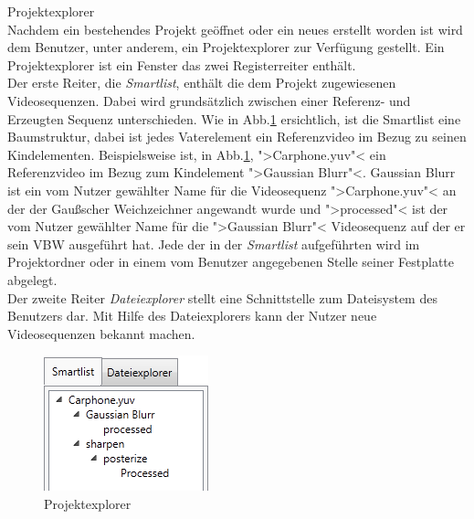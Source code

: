  Projektexplorer \\
Nachdem ein bestehendes Projekt geöffnet oder ein neues erstellt worden ist wird dem
Benutzer, unter anderem, ein Projektexplorer zur Verfügung gestellt. Ein Projektexplorer ist ein 
Fenster das zwei Registerreiter enthält. \\
Der erste Reiter, die \emph{Smartlist}, enthält die dem Projekt zugewiesenen Videosequenzen. Dabei wird
grundsätzlich zwischen einer Referenz- und Erzeugten Sequenz unterschieden. Wie in Abb.\ref{pExplorer}
ersichtlich, ist die Smartlist eine Baumstruktur, dabei ist jedes Vaterelement
ein Referenzvideo im Bezug zu seinen Kindelementen. Beispielsweise ist, in Abb.\ref{pExplorer}, 
">Carphone.yuv"< ein Referenzvideo im Bezug zum Kindelement ">Gaussian Blurr"<. Gaussian Blurr ist ein
vom Nutzer gewählter Name für die Videosequenz ">Carphone.yuv"< an der der Gaußscher Weichzeichner angewandt
wurde und ">processed"< ist der vom Nutzer gewählter Name für die ">Gaussian Blurr"< Videosequenz auf
der er sein \gls{VBW} ausgeführt hat. Jede der in der \emph{Smartlist} aufgeführten wird im Projektordner
oder in einem vom Benutzer angegebenen Stelle seiner Festplatte abgelegt.\\
Der zweite Reiter \emph{Dateiexplorer} stellt eine Schnittstelle zum Dateisystem des Benutzers dar. Mit Hilfe
des Dateiexplorers kann der Nutzer \projektTitel neue Videosequenzen bekannt machen.
\begin{figure}[h]
\includegraphics[scale=1]{bilder/projektexplorer.png}
\caption{Projektexplorer}
\label{pExplorer}
\end{figure}

